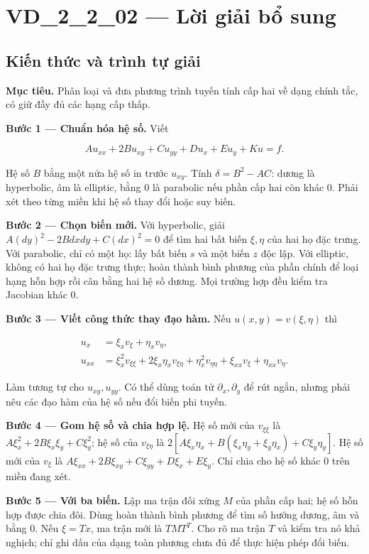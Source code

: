 \documentclass[10pt,a4paper]{article}
\begin{document}
\section*{VD\_2\_2\_02 — Lời giải bổ sung}
\subsection*{Kiến thức và trình tự giải}
\textbf{Mục tiêu.} Phân loại và đưa phương trình tuyến tính cấp hai về dạng chính tắc, có giữ đầy đủ các hạng cấp thấp.

\textbf{Bước 1 — Chuẩn hóa hệ số.} Viết


\[
A u_{xx}+2B u_{xy}+C u_{yy}+D u_x+E u_y+K u=f.
\]


Hệ số $B$ bằng một nửa hệ số in trước $u_{xy}$. Tính $\delta=B^2-AC$: dương là hyperbolic, âm là elliptic, bằng $0$ là parabolic nếu phần cấp hai còn khác $0$. Phải xét theo từng miền khi hệ số thay đổi hoặc suy biến.

\textbf{Bước 2 — Chọn biến mới.} Với hyperbolic, giải $A(dy)^2-2Bdxdy+C(dx)^2=0$ để tìm hai bất biến $\xi,\eta$ của hai họ đặc trưng. Với parabolic, chỉ có một họ: lấy bất biến $s$ và một biến $z$ độc lập. Với elliptic, không có hai họ đặc trưng thực; hoàn thành bình phương của phần chính để loại hạng hỗn hợp rồi cân bằng hai hệ số dương. Mọi trường hợp đều kiểm tra Jacobian khác $0$.

\textbf{Bước 3 — Viết công thức thay đạo hàm.} Nếu $u(x,y)=v(\xi,\eta)$ thì


\[
\begin{aligned}
u_x&=\xi_xv_\xi+\eta_xv_\eta,\\
u_{xx}&=\xi_x^2v_{\xi\xi}+2\xi_x\eta_xv_{\xi\eta}
+\eta_x^2v_{\eta\eta}+\xi_{xx}v_\xi+\eta_{xx}v_\eta.
\end{aligned}
\]


Làm tương tự cho $u_{xy},u_{yy}$. Có thể dùng toán tử $\partial_x,\partial_y$ để rút ngắn, nhưng phải nêu các đạo hàm của hệ số nếu đổi biến phi tuyến.

\textbf{Bước 4 — Gom hệ số và chia hợp lệ.} Hệ số mới của $v_{\xi\xi}$ là $A\xi_x^2+2B\xi_x\xi_y+C\xi_y^2$; hệ số của $v_{\xi\eta}$ là $2[A\xi_x\eta_x+B(\xi_x\eta_y+\xi_y\eta_x)+C\xi_y\eta_y]$. Hệ số mới của $v_\xi$ là $A\xi_{xx}+2B\xi_{xy}+C\xi_{yy}+D\xi_x+E\xi_y$. Chỉ chia cho hệ số khác $0$ trên miền đang xét.

\textbf{Bước 5 — Với ba biến.} Lập ma trận đối xứng $M$ của phần cấp hai; hệ số hỗn hợp được chia đôi. Dùng hoàn thành bình phương để tìm số hướng dương, âm và bằng $0$. Nếu $\xi=T x$, ma trận mới là $TMT^T$. Cho rõ ma trận $T$ và kiểm tra nó khả nghịch; chỉ ghi dấu của dạng toàn phương chưa đủ để thực hiện phép đổi biến.
\end{document}
